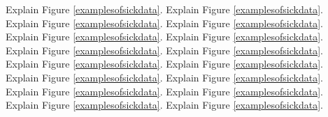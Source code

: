 Explain Figure \ref{examplesofsickdata}. 
Explain Figure \ref{examplesofsickdata}. 
Explain Figure \ref{examplesofsickdata}. 
Explain Figure \ref{examplesofsickdata}. 
Explain Figure \ref{examplesofsickdata}. 
Explain Figure \ref{examplesofsickdata}. 
Explain Figure \ref{examplesofsickdata}. 
Explain Figure \ref{examplesofsickdata}. 
Explain Figure \ref{examplesofsickdata}. 
Explain Figure \ref{examplesofsickdata}. 
Explain Figure \ref{examplesofsickdata}. 
Explain Figure \ref{examplesofsickdata}. 
Explain Figure \ref{examplesofsickdata}. 
Explain Figure \ref{examplesofsickdata}. 
Explain Figure \ref{examplesofsickdata}. 
Explain Figure \ref{examplesofsickdata}.

